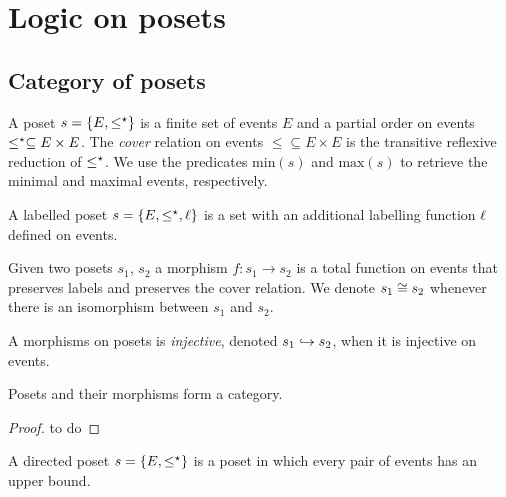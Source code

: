 \section{Logic on posets}

\subsection{Category of posets}
\label{sec:posets}

\begin{definition}[Poset]
  \label{def:poset}
  A poset $s=\{E,\leq^{\star}\}$ is a finite set of events $E$ and a partial order on events $\leq^{\star}\subseteq E\times E$. The \emph{cover} relation on events $\leq\subseteq E\times E$ is the transitive reflexive reduction of $\leq^{\star}$.
  We use the predicates $\text{min}(s)$ and $\text{max}(s)$ to retrieve the minimal and maximal events, respectively.

  A labelled poset $s=\{E,\leq^{\star},\ell\}$ is a set with an additional labelling function $\ell$ defined on events.
\end{definition}

\begin{definition}
  Given two posets $s_1$, $s_2$ a morphism $f:s_1\to s_2$ is a total function on events that preserves labels and preserves the cover relation. We denote $s_1\cong s_2$ whenever there is an isomorphism between $s_1$ and $s_2$.

  A morphisms on posets is \emph{injective}, denoted $s_1\hookrightarrow s_2$, when it is injective on events.
\end{definition}

\begin{lemma}
  Posets and their morphisms form a category.
\end{lemma}
\begin{mdframed}[backgroundcolor=blue!20]
  \begin{proof}
    to do
  \end{proof}
\end{mdframed}

\begin{definition}
  A directed poset $s=\{E,\leq^{\star}\}$ is a poset in which every pair of events has an upper bound.
\end{definition}


